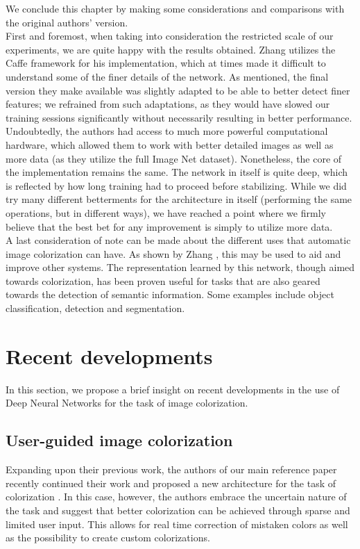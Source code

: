 \documentclass[twoside,twocolumn]{article}
\begin{document}
We conclude this chapter by making some considerations and comparisons with the original authors’ version. \\
First and foremost, when taking into consideration the restricted scale of our experiments, we are quite happy with the results obtained. Zhang \cite{Zhang:2016} utilizes the Caffe framework for his implementation, which at times made it difficult to understand some of the finer details of the network. As mentioned, the final version they make available \cite{Zhang:github} was slightly adapted to be able to better detect finer features; we refrained from such adaptations, as they would have slowed our training sessions significantly without necessarily resulting in better performance. \\
Undoubtedly, the authors had access to much more powerful computational hardware, which allowed them to work with better detailed images as well as more data (as they utilize the full Image Net dataset). Nonetheless, the core of the implementation remains the same. The network in itself is quite deep, which is reflected by how long training had to proceed before stabilizing. While we did try many different betterments for the architecture in itself (performing the same operations, but in different ways), we have reached a point where we firmly believe that the best bet for any improvement is simply to utilize more data.\\
A last consideration of note can be made about the different uses that automatic image colorization can have. As shown by Zhang \cite{Zhang:2016}, this may be used to aid and improve other systems. The representation learned by this network, though aimed towards colorization, has been proven useful for tasks that are also geared towards the detection of semantic information. Some examples include object classification, detection and segmentation.



\newpage

\section{Recent developments}

In this section, we propose a brief insight on recent developments in the use of Deep Neural Networks for the task of image colorization.

\subsection{User-guided image colorization}
Expanding upon their previous work, the authors of our main reference paper recently continued their work and proposed a new architecture for the task of colorization \cite{Zhang:2017}. In this case, however, the authors embrace the uncertain nature of the task and suggest that better colorization can be achieved through sparse and limited user input. This allows for real time correction of mistaken colors as well as the possibility to create custom colorizations.
\end{document}
